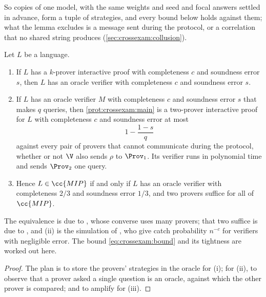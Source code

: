 \begin{refsection}
So copies of one model, with the same weights and seed and focal answers settled in advance, form a tuple of strategies, and every bound below holds against them; what the lemma excludes is a message sent during the protocol, or a correlation that no shared string produces (\cref{sec:crossexam:collusion}).

\begin{theorem}\label{thm:crossexam:oracle}
Let $L$ be a language.
\begin{enumerate}
\item If $L$ has a $k$-prover interactive proof with completeness $c$ and soundness error $s$, then $L$ has an oracle verifier with completeness $c$ and soundness error $s$.
\item If $L$ has an oracle verifier $M$ with completeness $c$ and soundness error $s$ that makes $q$ queries, then \cref{prot:crossexam:main} is a two-prover interactive proof for $L$ with completeness $c$ and soundness error at most
\begin{equation}\label{eq:crossexam:bound}
  1-\frac{1-s}{q}
\end{equation}
against every pair of provers that cannot communicate during the protocol, whether or not $\V$ also sends $\rho$ to $\Prov_1$. Its verifier runs in polynomial time and sends $\Prov_2$ one query.
\item Hence $L\in\cc{MIP}$ if and only if $L$ has an oracle verifier with completeness $2/3$ and soundness error $1/3$, and two provers suffice for all of $\cc{MIP}$.
\end{enumerate}
\end{theorem}

The equivalence is due to \textcite{FortnowRompelSipser1994}, whose converse uses many provers; that two suffice is due to \textcite{BenOrEtAl1988}, and (ii) is the simulation of \textcite{BabaiFortnowLund1991}, who give catch probability $n^{-c}$ for verifiers with negligible error. The bound \eqref{eq:crossexam:bound} and its tightness are worked out here.

\begin{proof}
The plan is to store the provers' strategies in the oracle for (i); for (ii), to observe that a prover asked a single question is an oracle, against which the other prover is compared; and to amplify for (iii).


\end{proof}
\end{refsection}
